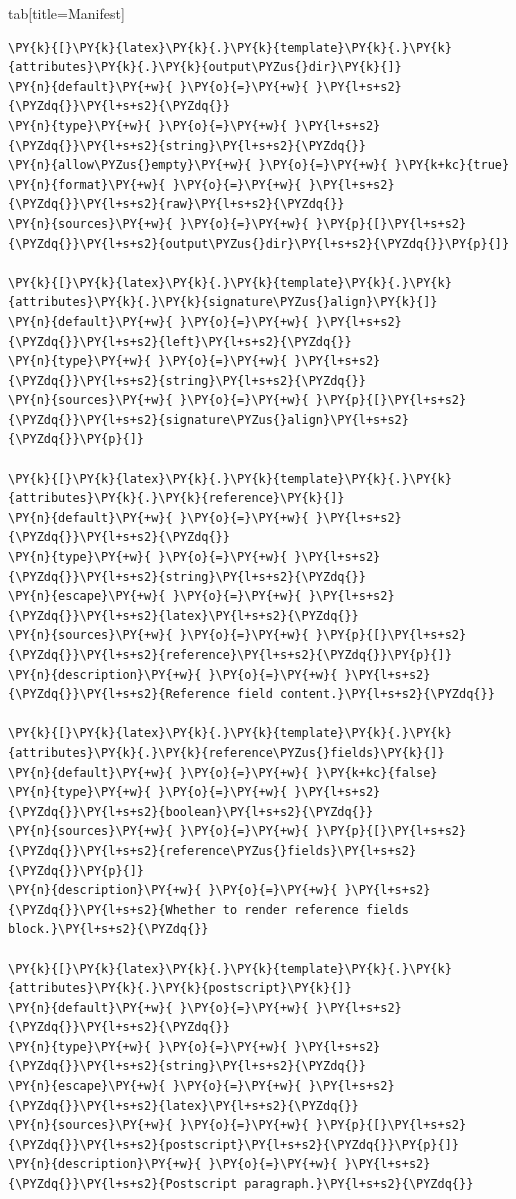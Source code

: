 \documentclass[a4paper,twoside]{article}
\begin{document}
\begin{tsdiv}{tab}[title=Manifest]
\begin{tscode}[lang=toml, engine=pygments]
\begin{Verbatim}[commandchars=\\\{\},breaklines, breakanywhere, commandchars=\\\{\}]
\PY{k}{[}\PY{k}{latex}\PY{k}{.}\PY{k}{template}\PY{k}{.}\PY{k}{attributes}\PY{k}{.}\PY{k}{output\PYZus{}dir}\PY{k}{]}
\PY{n}{default}\PY{+w}{ }\PY{o}{=}\PY{+w}{ }\PY{l+s+s2}{\PYZdq{}}\PY{l+s+s2}{\PYZdq{}}
\PY{n}{type}\PY{+w}{ }\PY{o}{=}\PY{+w}{ }\PY{l+s+s2}{\PYZdq{}}\PY{l+s+s2}{string}\PY{l+s+s2}{\PYZdq{}}
\PY{n}{allow\PYZus{}empty}\PY{+w}{ }\PY{o}{=}\PY{+w}{ }\PY{k+kc}{true}
\PY{n}{format}\PY{+w}{ }\PY{o}{=}\PY{+w}{ }\PY{l+s+s2}{\PYZdq{}}\PY{l+s+s2}{raw}\PY{l+s+s2}{\PYZdq{}}
\PY{n}{sources}\PY{+w}{ }\PY{o}{=}\PY{+w}{ }\PY{p}{[}\PY{l+s+s2}{\PYZdq{}}\PY{l+s+s2}{output\PYZus{}dir}\PY{l+s+s2}{\PYZdq{}}\PY{p}{]}

\PY{k}{[}\PY{k}{latex}\PY{k}{.}\PY{k}{template}\PY{k}{.}\PY{k}{attributes}\PY{k}{.}\PY{k}{signature\PYZus{}align}\PY{k}{]}
\PY{n}{default}\PY{+w}{ }\PY{o}{=}\PY{+w}{ }\PY{l+s+s2}{\PYZdq{}}\PY{l+s+s2}{left}\PY{l+s+s2}{\PYZdq{}}
\PY{n}{type}\PY{+w}{ }\PY{o}{=}\PY{+w}{ }\PY{l+s+s2}{\PYZdq{}}\PY{l+s+s2}{string}\PY{l+s+s2}{\PYZdq{}}
\PY{n}{sources}\PY{+w}{ }\PY{o}{=}\PY{+w}{ }\PY{p}{[}\PY{l+s+s2}{\PYZdq{}}\PY{l+s+s2}{signature\PYZus{}align}\PY{l+s+s2}{\PYZdq{}}\PY{p}{]}

\PY{k}{[}\PY{k}{latex}\PY{k}{.}\PY{k}{template}\PY{k}{.}\PY{k}{attributes}\PY{k}{.}\PY{k}{reference}\PY{k}{]}
\PY{n}{default}\PY{+w}{ }\PY{o}{=}\PY{+w}{ }\PY{l+s+s2}{\PYZdq{}}\PY{l+s+s2}{\PYZdq{}}
\PY{n}{type}\PY{+w}{ }\PY{o}{=}\PY{+w}{ }\PY{l+s+s2}{\PYZdq{}}\PY{l+s+s2}{string}\PY{l+s+s2}{\PYZdq{}}
\PY{n}{escape}\PY{+w}{ }\PY{o}{=}\PY{+w}{ }\PY{l+s+s2}{\PYZdq{}}\PY{l+s+s2}{latex}\PY{l+s+s2}{\PYZdq{}}
\PY{n}{sources}\PY{+w}{ }\PY{o}{=}\PY{+w}{ }\PY{p}{[}\PY{l+s+s2}{\PYZdq{}}\PY{l+s+s2}{reference}\PY{l+s+s2}{\PYZdq{}}\PY{p}{]}
\PY{n}{description}\PY{+w}{ }\PY{o}{=}\PY{+w}{ }\PY{l+s+s2}{\PYZdq{}}\PY{l+s+s2}{Reference field content.}\PY{l+s+s2}{\PYZdq{}}

\PY{k}{[}\PY{k}{latex}\PY{k}{.}\PY{k}{template}\PY{k}{.}\PY{k}{attributes}\PY{k}{.}\PY{k}{reference\PYZus{}fields}\PY{k}{]}
\PY{n}{default}\PY{+w}{ }\PY{o}{=}\PY{+w}{ }\PY{k+kc}{false}
\PY{n}{type}\PY{+w}{ }\PY{o}{=}\PY{+w}{ }\PY{l+s+s2}{\PYZdq{}}\PY{l+s+s2}{boolean}\PY{l+s+s2}{\PYZdq{}}
\PY{n}{sources}\PY{+w}{ }\PY{o}{=}\PY{+w}{ }\PY{p}{[}\PY{l+s+s2}{\PYZdq{}}\PY{l+s+s2}{reference\PYZus{}fields}\PY{l+s+s2}{\PYZdq{}}\PY{p}{]}
\PY{n}{description}\PY{+w}{ }\PY{o}{=}\PY{+w}{ }\PY{l+s+s2}{\PYZdq{}}\PY{l+s+s2}{Whether to render reference fields block.}\PY{l+s+s2}{\PYZdq{}}

\PY{k}{[}\PY{k}{latex}\PY{k}{.}\PY{k}{template}\PY{k}{.}\PY{k}{attributes}\PY{k}{.}\PY{k}{postscript}\PY{k}{]}
\PY{n}{default}\PY{+w}{ }\PY{o}{=}\PY{+w}{ }\PY{l+s+s2}{\PYZdq{}}\PY{l+s+s2}{\PYZdq{}}
\PY{n}{type}\PY{+w}{ }\PY{o}{=}\PY{+w}{ }\PY{l+s+s2}{\PYZdq{}}\PY{l+s+s2}{string}\PY{l+s+s2}{\PYZdq{}}
\PY{n}{escape}\PY{+w}{ }\PY{o}{=}\PY{+w}{ }\PY{l+s+s2}{\PYZdq{}}\PY{l+s+s2}{latex}\PY{l+s+s2}{\PYZdq{}}
\PY{n}{sources}\PY{+w}{ }\PY{o}{=}\PY{+w}{ }\PY{p}{[}\PY{l+s+s2}{\PYZdq{}}\PY{l+s+s2}{postscript}\PY{l+s+s2}{\PYZdq{}}\PY{p}{]}
\PY{n}{description}\PY{+w}{ }\PY{o}{=}\PY{+w}{ }\PY{l+s+s2}{\PYZdq{}}\PY{l+s+s2}{Postscript paragraph.}\PY{l+s+s2}{\PYZdq{}}


\end{Verbatim}
\end{tscode}
\end{tsdiv}
\end{document}
